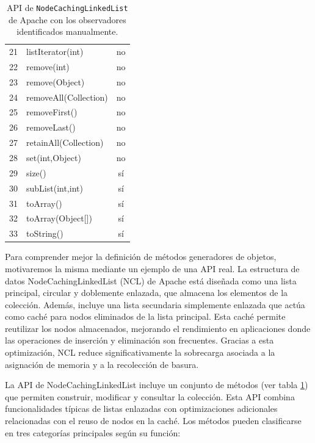 \begin{table}[H]
\begin{tabular}{clc}
21 & listIterator(int)            & no \\
22 & remove(int)                  & no \\
23 & remove(Object)               & no \\
24 & removeAll(Collection)        & no \\
25 & removeFirst()                & no \\
26 & removeLast()                 & no \\
27 & retainAll(Collection)        & no \\
28 & set(int,Object)              & no \\
29 & size()                       & sí \\
30 & subList(int,int)             & sí \\
31 & toArray()                    & sí \\
32 & toArray(Object[])            & sí \\
33 & toString()                   & sí \\
\bottomrule
\end{tabular}
\caption{API de \texttt{NodeCachingLinkedList} de Apache con los observadores identificados manualmente.}
\label{tab:ncl-api}
\end{table}


Para comprender mejor la definición de métodos generadores de objetos, motivaremos la misma mediante un ejemplo de una API real. La estructura de datos NodeCachingLinkedList (NCL) de Apache \cite{apache} está diseñada como una lista principal, circular y doblemente enlazada, que almacena los elementos de la colección. Además, incluye una lista secundaria simplemente enlazada que actúa como caché para nodos eliminados de la lista principal. Esta caché permite reutilizar los nodos almacenados, mejorando el rendimiento en aplicaciones donde las operaciones de inserción y eliminación son frecuentes. Gracias a esta optimización, NCL reduce significativamente la sobrecarga asociada a la asignación de memoria y a la recolección de basura. 

La API de NodeCachingLinkedList incluye un conjunto de métodos (ver tabla \ref{tab:ncl-api}) que permiten construir, modificar y consultar la colección. Esta API combina funcionalidades típicas de listas enlazadas con optimizaciones adicionales relacionadas con el reuso de nodos en la caché. Los métodos pueden clasificarse en tres categorías principales según su función: 

